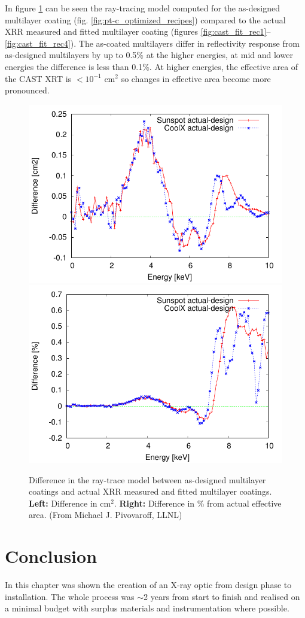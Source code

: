 In figure \ref{fig:raytracing3} can be seen the ray-tracing model computed for the as-designed multilayer coating (fig. \ref{fig:pt-c_optimized_recipes}) compared to the actual XRR measured and fitted multilayer coating (figures \ref{fig:cast_fit_rec1}--\ref{fig:cast_fit_rec4}). The as-coated multilayers differ in reflectivity response from as-designed multilayers by up to 0.5\% at the higher energies, at mid and lower energies the difference is less than 0.1\%. At higher energies, the effective area of the CAST XRT is  $< 10^{-1}$ cm$^2$ so changes in effective area become more pronounced.

\begin{figure}[htbp]
  \centering
    \includegraphics[width=0.47\linewidth]{figures/cast/raytracing_diff_cm2.pdf}
    \includegraphics[width=0.47\linewidth]{figures/cast/raytracing_diff_perc.pdf}
  \caption{\footnotesize Difference in the ray-trace model between as-designed multilayer coatings and actual XRR measured and fitted multilayer coatings.  \textbf{Left:} Difference in cm$^2$. \textbf{Right:} Difference in \% from actual effective area. (From Michael J. Pivovaroff, LLNL) }
  \label{fig:raytracing3}
\end{figure}

\section{Conclusion}
In this chapter was shown the creation of an X-ray optic from design phase to installation. The whole process was $\sim$2 years from start to finish and realised on a minimal budget with surplus materials and instrumentation where possible.

